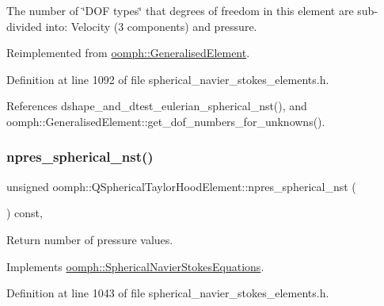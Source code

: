 The number of \char`\"{}\+D\+O\+F types\char`\"{} that degrees of freedom in this element are sub-\/divided into\+: Velocity (3 components) and pressure. 



Reimplemented from \hyperlink{classoomph_1_1GeneralisedElement_a0c6037a870597b35dcf1c780710b9a56}{oomph\+::\+Generalised\+Element}.



Definition at line 1092 of file spherical\+\_\+navier\+\_\+stokes\+\_\+elements.\+h.



References dshape\+\_\+and\+\_\+dtest\+\_\+eulerian\+\_\+spherical\+\_\+nst(), and oomph\+::\+Generalised\+Element\+::get\+\_\+dof\+\_\+numbers\+\_\+for\+\_\+unknowns().

\mbox{\label{classoomph_1_1QSphericalTaylorHoodElement_af923b447673c5a89772989e91d8f6603}} 
\subsubsection{\texorpdfstring{npres\+\_\+spherical\+\_\+nst()}{npres\_spherical\_nst()}}
{\footnotesize\ttfamily unsigned oomph\+::\+Q\+Spherical\+Taylor\+Hood\+Element\+::npres\+\_\+spherical\+\_\+nst (\begin{DoxyParamCaption}{ }\end{DoxyParamCaption}) const\hspace{0.3cm}{\ttfamily [inline]}, {\ttfamily [virtual]}}



Return number of pressure values. 



Implements \hyperlink{classoomph_1_1SphericalNavierStokesEquations_ae01203564bc66dacf84c1ed65e4b7930}{oomph\+::\+Spherical\+Navier\+Stokes\+Equations}.



Definition at line 1043 of file spherical\+\_\+navier\+\_\+stokes\+\_\+elements.\+h.

\mbox{\label{classoomph_1_1QSphericalTaylorHoodElement_af3864809dfd77246f0ec052480ac397f}} 
